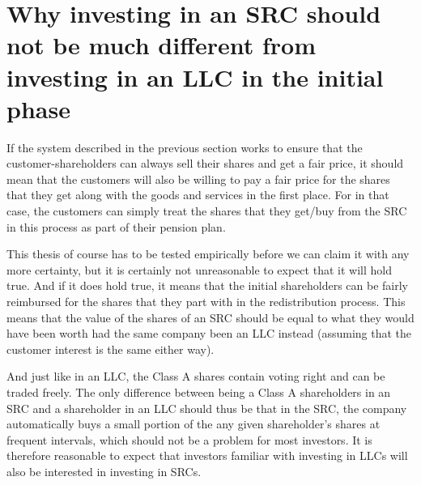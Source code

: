 \documentclass{article}
\begin{document}









\section{Why investing in an SRC should not be much different from investing in an LLC in the initial phase}
\label{sect_thesis}

If the system described in the previous section works to ensure that the customer-shareholders can always sell their shares and get a fair price, it should mean that the customers will also be willing to pay a fair price for the shares that they get along with the goods and services in the first place. For in that case, the customers can simply treat the shares that they get/buy from the SRC in this process as part of their pension plan. 

This thesis of course has to be tested empirically before we can claim it with any more certainty, but it is certainly not unreasonable to expect that it will hold true.
%
And if it does hold true, it means that the initial shareholders can be fairly reimbursed for the shares that they part with in the redistribution process. This means that the value of the shares of an SRC should be equal to what they would have been worth had the same company been an LLC instead (assuming that the customer interest is the same either way).

And just like in an LLC, the Class A shares contain voting right and can be traded freely. The only difference between being a Class A shareholders in an SRC and a shareholder in an LLC should thus be that in the SRC, the company automatically buys a small portion of the any given shareholder's shares at frequent intervals, which should not be a problem for most investors. It is therefore reasonable to expect that investors familiar with investing in LLCs will also be interested in investing in SRCs. 
\end{document}
